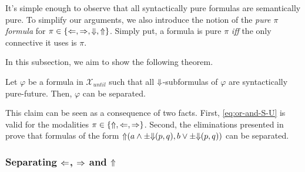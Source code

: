 \documentclass[a4paper,UKenglish,cleveref, autoref, thm-restate, numberwithinsect]{lipics-v2021}
\def\Larrow{\ensuremath\mathord{\Leftarrow}}
\def\Rarrow{\ensuremath\mathord{\Rightarrow}}
\def\Uarrow{\ensuremath\mathord{\Uparrow}}
\def\Darrow{\ensuremath\mathord{\Downarrow}}
\begin{document}
It's simple enough to observe that all syntactically pure formulas are semantically pure. To simplify our arguments, we also introduce the notion of the \textit{pure $\pi$ formula} for $\pi \in \{ \Larrow, \Rarrow, \Darrow, \Uarrow \}$. Simply put, a formula is pure $\pi$ \textit{iff} the only connective it uses is $\pi$.

In this subsection, we aim to show the following theorem.
\begin{claim*}
    \label{claim:partial-separation-trees}
    Let $\varphi$ be a formula in $\mathcal{X}_{until}$ such that all $\Darrow$-subformulas of $\varphi$ are syntactically pure-future. Then, $\varphi$ can be separated.
\end{claim*}
This claim can be seen as a consequence of two facts. First, \eqref{eq:or-and-S-U} is valid for the modalities $\pi \in \{\Uarrow, \Larrow, \Rarrow\}$. Second, the eliminations presented in \cite{xpathComplete} prove that formulas of the form $\Uarrow(a \land \pm \Darrow(p, q), b \lor \pm \Darrow(p, q))$ can be separated.

\subsubsection{Separating $\Larrow$, $\Rarrow$ and $\Uarrow$}
\end{document}
